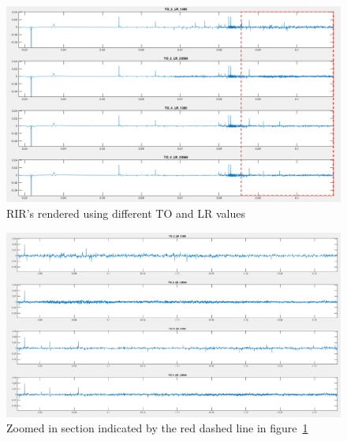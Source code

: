 \documentclass[../../main.tex]{subfiles}
\begin{document}
			\begin{figure}[h]
				\centerline{\includegraphics[width=\textwidth]{Sections/Implementation/Odeon/images/OdeonSettings/settingsFigure_edit.png}}
				\caption{\ac{RIR}'s rendered using different \ac{TO} and LR values}
				\label{odeonSettingsRIR}
			\end{figure}
			\begin{figure}[h]
				\centerline{\includegraphics[width=\textwidth]{Sections/Implementation/Odeon/images/OdeonSettings/settingsFigureZoomed.png}}
				\caption{Zoomed in section indicated by the red dashed line in figure~\ref{odeonSettingsRIR}}
				\label{odeonSettingsRIRZoomed}
			\end{figure}
\end{document}

